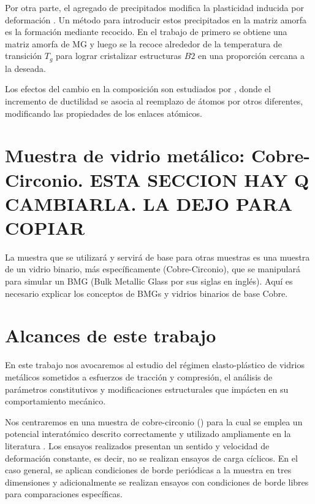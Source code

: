 Por otra parte, el agregado de precipitados modifica la plasticidad inducida por deformación \citep{kuo14}. Un método para introducir estos precipitados en la matriz amorfa es la formación mediante recocido. En el trabajo de \cite{wei14} primero se obtiene una matriz amorfa de MG y luego se la recoce alrededor de la temperatura de transición $T_{g}$ para lograr cristalizar estructuras $B2$ en una proporción cercana a la deseada.

Los efectos del cambio en la composición son estudiados por \cite{Zheng12}, donde el incremento de ductilidad se asocia al reemplazo de átomos por otros diferentes, modificando las propiedades de los enlaces atómicos.


\section{Muestra de vidrio metálico: Cobre-Circonio. ESTA SECCION HAY Q CAMBIARLA. LA DEJO PARA COPIAR}
\label{S123456}

La muestra que se utilizará y servirá de base para otras muestras es una muestra de un vidrio binario, más específicamente \CuZr (Cobre-Circonio), que se manipulará para simular un BMG (Bulk Metallic Glass por sus siglas en inglés). Aquí es necesario explicar los conceptos de BMGs y vidrios binarios de base Cobre.



\section{Alcances de este trabajo}
\label{S1_3}

En este trabajo nos avocaremos al estudio del régimen elasto-plástico de vidrios metálicos sometidos a esfuerzos de tracción y compresión, el análisis de parámetros constitutivos y modificaciones estructurales que impácten en su comportamiento mecánico.

Nos centraremos en una muestra de cobre-circonio (\CuZr) para la cual se emplea un potencial interatómico descrito correctamente \citep{daw84} y utilizado ampliamente en la literatura \citep{shimizu07,cao09,cheng09,arman10,cheng11,wang12}. Los ensayos realizados presentan un sentido y velocidad de deformación constante, es decir, no se realizan ensayos de carga cíclicos. En el caso general, se aplican condiciones de borde periódicas a la muestra en tres dimensiones y adicionalmente se realizan ensayos con condiciones de borde libres para comparaciones específicas.


